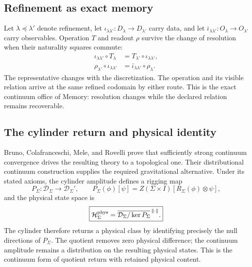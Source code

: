 \documentclass[10pt]{article}
\begin{document}
\subsection*{Refinement as exact memory}
Let $\lambda\preceq\lambda'$ denote refinement, let
$\iota_{\lambda\lambda'}:D_\lambda\to D_{\lambda'}$ carry data, and let
$\bar\iota_{\lambda\lambda'}:O_\lambda\to O_{\lambda'}$ carry observables.
Operation $T$ and readout $\rho$ survive the change of resolution when their
naturality squares commute:
\begin{equation}
\boxed{\begin{aligned}
\iota_{\lambda\lambda'}\circ T_\lambda
  &=T_{\lambda'}\circ\iota_{\lambda\lambda'},\\
\rho_{\lambda'}\circ\iota_{\lambda\lambda'}
  &=\bar\iota_{\lambda\lambda'}\circ\rho_\lambda.
\end{aligned}}
\label{eq:continuumnaturality}
\end{equation}
The representative changes with the discretization. The operation and its
visible relation arrive at the same refined codomain by either route. This is
the exact continuum office of Memory: resolution changes while the declared
relation remains recoverable.

\subsection*{The cylinder return and physical identity}
Bruno, Colafranceschi, Mele, and Rovelli prove that sufficiently strong
continuum convergence drives the resulting theory to a topological one. Their
distributional continuum construction supplies the required gravitational
alternative. Under its stated axioms, the cylinder amplitude defines a rigging
map
\begin{equation}
P_\Sigma:\mathcal D_\Sigma\longrightarrow\mathcal D_\Sigma',\qquad
P_\Sigma(\phi)[\psi]
=Z(\Sigma\times I)[R_\Sigma(\phi)\otimes\psi],
\label{eq:riggingmap}
\end{equation}
and the physical state space is
\begin{equation}
\boxed{\mathcal H_\Sigma^{\rm phys}
=\overline{\mathcal D_\Sigma/\ker P_\Sigma}^{\,\|\cdot\|}.}
\label{eq:physicalquotient}
\end{equation}
The cylinder therefore returns a physical class by identifying precisely the
null directions of $P_\Sigma$. The quotient removes zero physical difference;
the continuum amplitude remains a distribution on the resulting physical
states. This is the continuum form of quotient return with retained physical
content.
\end{document}
